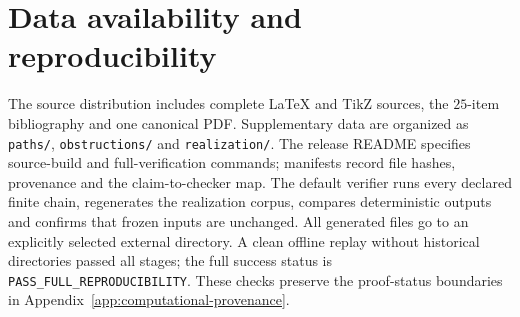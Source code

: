\section{Data availability and reproducibility}
\label{app:reproducibility}

The source distribution includes complete LaTeX and TikZ sources, the
$25$-item bibliography and one canonical PDF. Supplementary data are organized as
\texttt{paths/}, \texttt{obstructions/} and \texttt{realization/}. The release README
specifies source-build and full-verification commands; manifests record file
hashes, provenance and the claim-to-checker map. The default verifier runs every
declared finite chain, regenerates the realization corpus, compares deterministic
outputs and confirms that frozen inputs are unchanged. All generated files go to
an explicitly selected external directory. A clean offline replay without
historical directories passed all stages; the full success status is
\texttt{PASS\_FULL\_REPRODUCIBILITY}. These checks preserve the proof-status
boundaries in Appendix~\ref{app:computational-provenance}.
